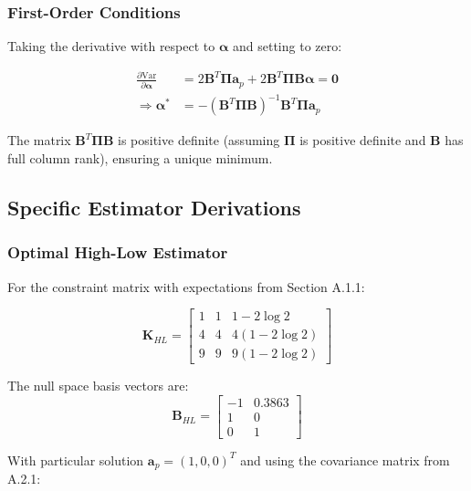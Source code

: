 \subsubsection{ First-Order Conditions}

Taking the derivative with respect to $\boldsymbol{\alpha}$ and setting to zero:

\begin{align}
\frac{\partial \text{Var}}{\partial \boldsymbol{\alpha}} &= 2\mathbf{B}^T\boldsymbol{\Pi}\mathbf{a}_p + 2\mathbf{B}^T\boldsymbol{\Pi}\mathbf{B}\boldsymbol{\alpha} = \mathbf{0} \\
\Rightarrow \boldsymbol{\alpha}^* &= -(\mathbf{B}^T\boldsymbol{\Pi}\mathbf{B})^{-1}\mathbf{B}^T\boldsymbol{\Pi}\mathbf{a}_p
\end{align}

The matrix $\mathbf{B}^T\boldsymbol{\Pi}\mathbf{B}$ is positive definite (assuming $\boldsymbol{\Pi}$ is positive definite and $\mathbf{B}$ has full column rank), ensuring a unique minimum.

\subsection{ Specific Estimator Derivations}

\subsubsection{ Optimal High-Low Estimator}

For the constraint matrix with expectations from Section A.1.1:

\begin{equation}
\mathbf{K}_{HL} = \begin{bmatrix}
1 & 1 & 1 - 2\log 2 \\
4 & 4 & 4(1 - 2\log 2) \\
9 & 9 & 9(1 - 2\log 2)
\end{bmatrix}
\end{equation}

The null space basis vectors are:
\begin{equation}
\mathbf{B}_{HL} = \begin{bmatrix}
-1 & 0.3863 \\
1 & 0 \\
0 & 1
\end{bmatrix}
\end{equation}

With particular solution $\mathbf{a}_p = (1, 0, 0)^T$ and using the covariance matrix from A.2.1:


